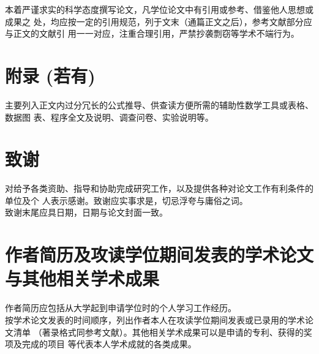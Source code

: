 本着严谨求实的科学态度撰写论文，凡学位论文中有引用或参考、借鉴他人思想或成果之
处，均应按一定的引用规范，列于文末（通篇正文之后），参考文献部分应与正文的文献引
用一一对应，注重合理引用，严禁抄袭剽窃等学术不端行为。

\section{附录 (若有)}

主要列入正文内过分冗长的公式推导、供查读方便所需的辅助性数学工具或表格、数据图
表、程序全文及说明、调查问卷、实验说明等。

\section{致谢}

对给予各类资助、指导和协助完成研究工作，以及提供各种对论文工作有利条件的单位及个
人表示感谢。致谢应实事求是，切忌浮夸与庸俗之词。\\
致谢末尾应具日期，日期与论文封面一致。

\section{作者简历及攻读学位期间发表的学术论文与其他相关学术成果}

作者简历应包括从大学起到申请学位时的个人学习工作经历。\\
按学术论文发表的时间顺序，列出作者本人在攻读学位期间发表或已录用的学术论文清单
（著录格式同参考文献）。其他相关学术成果可以是申请的专利、获得的奖项及完成的项目
等代表本人学术成就的各类成果。